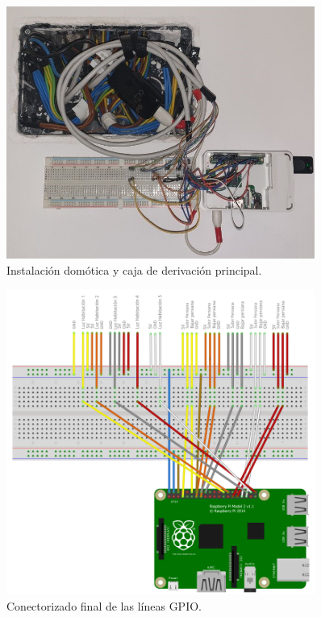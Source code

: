 \begin{figure}[h]
    \centering
    \includegraphics[width=0.9\textwidth]{img/fotos/RBP-instalada.jpeg}
    \caption{Instalación domótica y caja de derivación principal.} \label{Img:InstalacionDomotica}
\end{figure}


\begin{figure}[h]
    \centering
    \includegraphics[width=0.9\textwidth]{img/RbP_CompletaLineas.png}
    \caption{Conectorizado final de las líneas GPIO.} \label{Img:RbP_CompletaLineas}
\end{figure}

